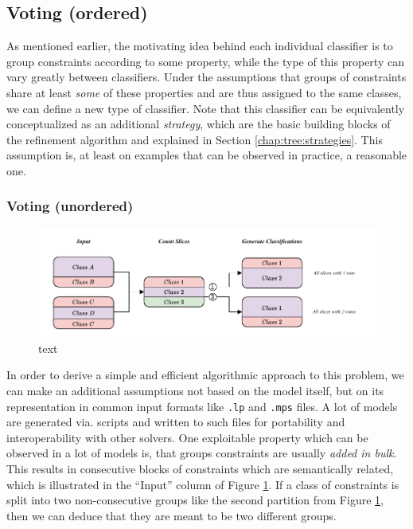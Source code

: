 			\clearpage
			
		\subsection{Voting (ordered)}
		\label{chap:tree:classifiers:voting}
		
			As mentioned earlier, the motivating idea behind each individual classifier is to group constraints according to some property, while the type of this property can vary greatly between classifiers.
			Under the assumptions that groups of constraints share at least \textit{some} of these properties and are thus assigned to the same classes, we can define a new type of classifier.
			Note that this classifier can be equivalently conceptualized as an additional \textit{strategy}, which are the basic building blocks of the refinement algorithm and explained in Section \ref{chap:tree:strategies}.
			This assumption is, at least on examples that can be observed in practice, a reasonable one.
			
			\subsubsection{Voting (unordered)}
			
				\begin{figure}[ht!]
					\centering
					\includegraphics[scale=1.05]{Bilder/DrawIO/strat_ordered_voting_pdf}
					\caption{text}
					\label{fig:tree:classifiers:ovoting}
				\end{figure}
			
				In order to derive a simple and efficient algorithmic approach to this problem, we can make an additional assumptions not based on the model itself, but on its representation in common input formats like \lstinline|.lp| and \lstinline|.mps| files.
				A lot of models are generated via. scripts and written to such files for portability and interoperability with other solvers.
				One exploitable property which can be observed in a lot of models is, that groups constraints are usually \textit{added in bulk}.
				This results in consecutive blocks of constraints which are semantically related, which is illustrated in the \enquote{Input} column of Figure \ref{fig:tree:classifiers:ovoting}.
				If a class of constraints is split into two non-consecutive groups like the second partition from Figure \ref{fig:tree:classifiers:ovoting}, then we can deduce that they are meant to be two different groups.
			

